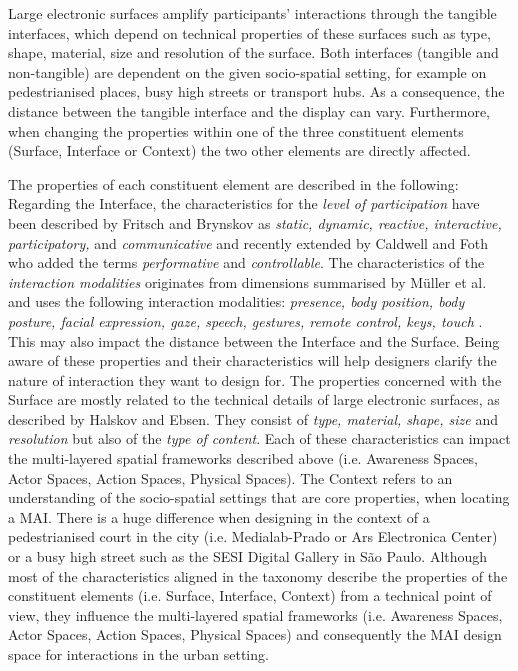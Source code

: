 Large electronic surfaces amplify participants’ interactions through the tangible interfaces, which depend on technical properties of these surfaces such as type, shape, material, size and resolution of the surface. Both interfaces (tangible and non-tangible) are dependent on the given socio-spatial setting, for example on pedestrianised places, busy high streets or transport hubs. 
As a consequence, the distance between the tangible interface and the display can vary. 
Furthermore, when changing the properties within one of the three constituent elements (Surface, Interface or Context) the two other elements are directly affected. 

The properties of each constituent element are described in the following: Regarding the Interface, the characteristics for the \textit{level of participation} have been described by Fritsch and Brynskov as \textit{static, dynamic, reactive, interactive, participatory,} and \textit{communicative} and recently extended by Caldwell and Foth who added the terms \textit{performative} and \textit{controllable}.
The characteristics of the \textit{interaction modalities} originates from dimensions summarised by Müller et al. and uses the following interaction modalities: \textit{presence, body position, body posture, facial expression, gaze, speech, gestures, remote control, keys, touch} . 
This may also impact the distance between the Interface and the Surface. 
Being aware of these properties and their characteristics will help designers clarify the nature of interaction they want to design for.
The properties concerned with the Surface are mostly related to the technical details of large electronic surfaces, as described by Halskov and Ebsen.
They consist of \textit{type, material, shape, size} and \textit{resolution} but also of the \textit{type of content}. 
Each of these characteristics can impact the multi-layered spatial frameworks described above (i.e. Awareness Spaces, Actor Spaces, Action Spaces, Physical Spaces).
The Context refers to an understanding of the socio-spatial settings that are core properties, when locating a MAI. 
There is a huge difference when designing in the context of a pedestrianised court in the city (i.e. Medialab-Prado or Ars Electronica Center) or a busy high street such as the SESI Digital Gallery in São Paulo.
Although most of the characteristics aligned in the taxonomy describe the properties of the constituent elements (i.e. Surface, Interface, Context) from a technical point of view, they influence the multi-layered spatial frameworks (i.e. Awareness Spaces, Actor Spaces, Action Spaces, Physical Spaces) and consequently the MAI design space for interactions in the urban setting. 

